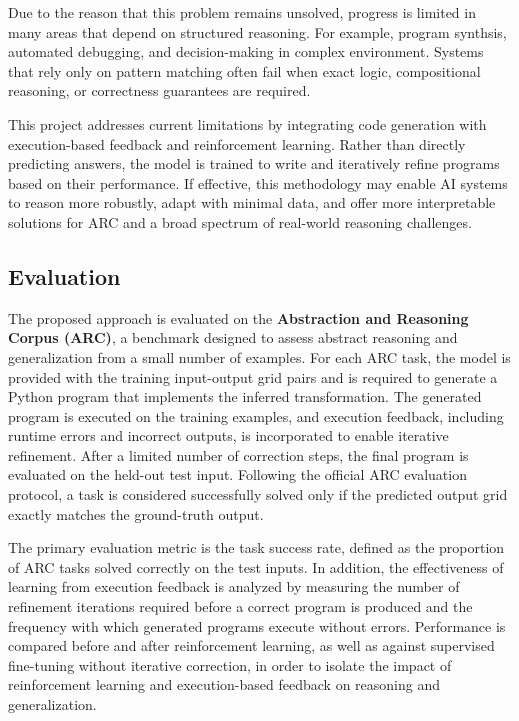 \documentclass[11pt,letterpaper]{article}
\begin{document}
Due to the reason that this problem remains unsolved, progress is limited in many areas that depend on structured reasoning. For example, program synthsis, automated debugging, and decision-making in complex environment. Systems that rely only on pattern matching often fail when exact logic, compositional reasoning, or correctness guarantees are required.

This project addresses current limitations by integrating code generation with execution-based feedback and reinforcement learning. Rather than directly predicting answers, the model is trained to write and iteratively refine programs based on their performance. If effective, this methodology may enable AI systems to reason more robustly, adapt with minimal data, and offer more interpretable solutions for ARC and a broad spectrum of real-world reasoning challenges.





\subsection{Evaluation}
The proposed approach is evaluated on the \textbf{Abstraction and Reasoning Corpus (ARC)}, a benchmark designed to assess abstract reasoning and generalization from a small number of examples. For each ARC task, the model is provided with the training input-output grid pairs and is required to generate a Python program that implements the inferred transformation. The generated program is executed on the training examples, and execution feedback, including runtime errors and incorrect outputs, is incorporated to enable iterative refinement. After a limited number of correction steps, the final program is evaluated on the held-out test input. Following the official ARC evaluation protocol, a task is considered successfully solved only if the predicted output grid exactly matches the ground-truth output.

The primary evaluation metric is the task success rate, defined as the proportion of ARC tasks solved correctly on the test inputs. In addition, the effectiveness of learning from execution feedback is analyzed by measuring the number of refinement iterations required before a correct program is produced and the frequency with which generated programs execute without errors. Performance is compared before and after reinforcement learning, as well as against supervised fine-tuning without iterative correction, in order to isolate the impact of reinforcement learning and execution-based feedback on reasoning and generalization.
\end{document}
